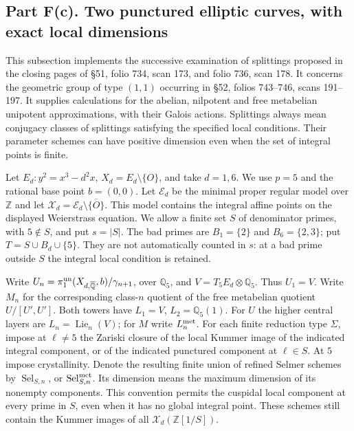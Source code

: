 \subsection{Part F(c). Two punctured elliptic curves, with exact local dimensions}

This subsection implements the successive examination of splittings proposed
in the closing pages of \S51, folio 734, scan 173, and folio 736, scan 178.
It concerns the geometric group of type $(1,1)$ occurring in \S52,
folios 743--746, scans 191--197. It supplies calculations for the abelian,
nilpotent and free metabelian unipotent approximations, with their Galois
actions. Splittings always mean conjugacy classes of splittings satisfying
the specified local conditions. Their parameter schemes can have positive
dimension even when the set of integral points is finite.

Let $E_d:y^2=x^3-d^2x$, $X_d=E_d\setminus\{O\}$, and take $d=1,6$.
We use $p=5$ and the rational base point $b=(0,0)$. Let $\mathcal E_d$
be the minimal proper regular model over $\mathbb Z$ and let
$\mathcal X_d=\mathcal E_d\setminus\overline{\{O\}}$. This model contains
the integral affine points on the displayed Weierstrass equation. We allow
a finite set $S$ of denominator primes, with $5\notin S$, and put $s=|S|$.
The bad primes are $B_1=\{2\}$ and $B_6=\{2,3\}$; put
$T=S\cup B_d\cup\{5\}$. They are not automatically counted in $s$:
at a bad prime outside $S$ the integral local condition is retained.

Write $U_n=\pi_1^{\rm un}(X_{d,\overline{\mathbb Q}},b)/\gamma_{n+1}$,
over $\mathbb Q_5$, and $V=T_5E_d\otimes\mathbb Q_5$. Thus $U_1=V$.
Write $M_n$ for the corresponding class-$n$ quotient of the free metabelian
quotient $U/[U',U']$. Both towers have $L_1=V$, $L_2=\mathbb Q_5(1)$.
For $U$ the higher central layers are $L_n=\operatorname{Lie}_n(V)$;
for $M$ write $L_n^{\rm met}$.
For each finite reduction type $\Sigma$, impose at $\ell\ne5$ the
Zariski closure of the local Kummer image of the indicated integral
component, or of the indicated punctured component at $\ell\in S$.
At $5$ impose crystallinity. Denote the resulting finite union of
refined Selmer schemes by $\operatorname{Sel}_{S,n}$, or
$\operatorname{Sel}^{\rm met}_{S,n}$. Its dimension means the maximum
dimension of its nonempty components. This convention permits the cuspidal
local component at every prime in $S$, even when it has no global integral
point. These schemes still contain the Kummer images of all
$\mathcal X_d(\mathbb Z[1/S])$.

